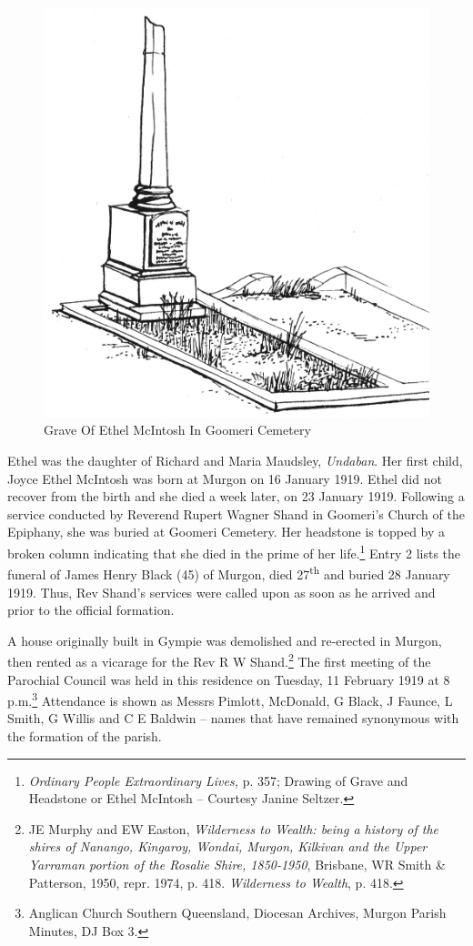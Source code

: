 \begin{figure}
\begin{center}
\includegraphics[width=.7\linewidth,center]{../images/graveOfEthelMcIntoshInGoomeriCemetery.jpg}
\caption{Grave Of Ethel McIntosh In Goomeri Cemetery}
\end{center}
\end{figure}




Ethel was the daughter of Richard and Maria Maudsley, \emph{Undaban}. Her first child, Joyce Ethel McIntosh was born at Murgon on 16 January 1919. Ethel did not recover from the birth and she died a week later, on 23 January 1919. Following a service conducted by Reverend Rupert Wagner Shand in Goomeri's Church of the Epiphany, she was buried at Goomeri Cemetery. Her headstone is topped by a broken column indicating that she died in the prime of her life.\footnote{\emph{Ordinary People Extraordinary Lives,} p. 357; Drawing of Grave and Headstone or Ethel McIntosh -- Courtesy Janine Seltzer.} Entry 2 lists the funeral of James Henry Black (45) of Murgon, died 27\textsuperscript{th} and buried 28 January 1919. Thus, Rev Shand's services were called upon as soon as he arrived and prior to the official formation.


A house originally built in Gympie was demolished and re-erected in Murgon, then rented as a vicarage for the Rev R W Shand.\footnote{JE Murphy and EW Easton, \emph{Wilderness to Wealth: being a history of the shires of Nanango, Kingaroy, Wondai, Murgon, Kilkivan and the Upper Yarraman portion of the Rosalie Shire, 1850-1950}, Brisbane, WR Smith \& Patterson, 1950, repr. 1974, p. 418. \emph{Wilderness to Wealth}, p. 418.} The first meeting of the Parochial Council was held in this residence on Tuesday, 11 February 1919 at 8 p.m.\footnote{Anglican Church Southern Queensland, Diocesan Archives, Murgon Parish Minutes, DJ Box 3.} Attendance is shown as Messrs Pimlott, McDonald, G Black, J Faunce, L Smith, G Willis and C E Baldwin -- names that have remained synonymous with the formation of the parish.


